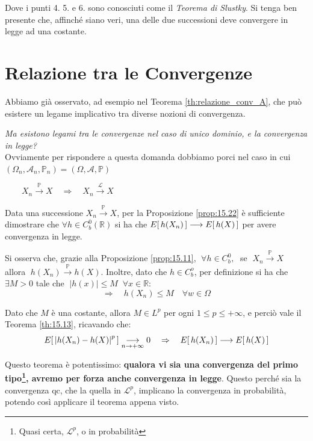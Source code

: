 \bigskip
\noindent Dove i punti 4. 5. e 6. sono conosciuti come il \textit{Teorema di Slustky}. Si tenga ben presente che, affinché siano veri, una delle due successioni deve convergere in legge ad una costante.

\bigskip

\section{Relazione tra le Convergenze}
Abbiamo già osservato, ad esempio nel Teorema \ref{th:relazione_conv_A}, che può esistere un legame implicativo tra diverse nozioni di convergenza. 

\medskip
\noindent \textit{Ma esistono legami tra le convergenze nel caso di unico dominio, e la convergenza in legge?}\\
Ovviamente per rispondere a questa domanda dobbiamo porci nel caso in cui $(\Omega_n, \mathcal{A}_n, \mathbb{P}_n) = (\Omega, \mathcal{A}, \mathbb{P})$

\begin{teorema}
    $\qquad \boxed{X_n\overset{\mathbb P}{\longrightarrow} X \quad \Rightarrow \quad X_n\overset{\mathcal{L}}{\longrightarrow} X}$
    \begin{dimostrazione}
        Data una successione $X_n\overset{\mathbb P}{\longrightarrow} X$, per la Proposizione \ref{prop:15.22} è sufficiente dimostrare che $\forall h\in C^0_b(\mathbb R)$ si ha che $E\!\left[\,h(X_n)\,\right]\longrightarrow E\!\left[\,h(X)\,\right]$ per avere convergenza in legge.

        \medskip
        Si osserva che, grazie alla Proposizione \ref{prop:15.11}, $\;\forall h\in C^0_b, \;$ se $\;X_n\overset{\mathbb P}{\longrightarrow} X\; $ allora $\;h(X_n)\overset{\mathbb P}{\longrightarrow} h(X)$. Inoltre, dato che $h\in C^o_b$, per definizione si ha che $\exists M>0$ tale che $\;|h(x)|\leq M\;\;\forall x\in\mathbb{R}$:
        \[\Rightarrow \quad h(X_n) \leq M\quad \forall w\in \Omega\]

        Dato che $M$ è una costante, allora $M\in L^p$ per ogni $1\leq p\leq +\infty$, e perciò vale il Teorema \ref{th:15.13}, ricavando che:
        \[E\!\left[\,\left|h(X_n) - h(X)\right|^p\,\right] \underset{n\to+\infty}{\longrightarrow} 0 \quad \Rightarrow\quad E\!\left[\,h(X_n)\,\right] \longrightarrow E\!\left[\,h(X)\,\right]\]
        
        
    \end{dimostrazione}
\end{teorema}

Questo teorema è potentissimo: \textbf{qualora vi sia una convergenza del primo tipo\footnote{Quasi certa, $\mathcal{L}^p$, o in probabilità}, avremo per forza anche convergenza in legge}. Questo perché sia la convergenza qc, che la quella in $\mathcal{L}^p$, implicano la convergenza in probabilità, potendo così applicare il teorema appena visto.

